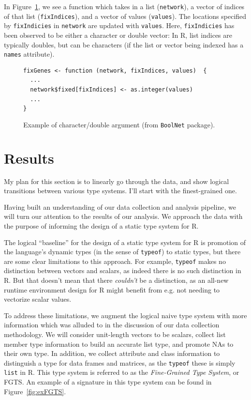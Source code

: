 \documentclass[acmsmall,10pt,review,anonymous]{acmart}\settopmatter{printfolios=true,printccs=false,printacmref=false}
\newcommand{\code}[1]{\lstinline|#1|\xspace}
\begin{document}
In Figure~\ref{fig:chardbl}, we see a function which takes in a list ({\tt network}), a vector of indices of that list ({\tt fixIndices}), and a vector of values ({\tt values}).
The locations specified by {\tt fixIndicies} in {\tt network} are updated with {\tt values}.
Here, {\tt fixIndicies} has been observed to be either a character or double vector:
In R, list indices are typically doubles, but can be characters (if the list or vector being indexed has a {\tt names} attribute).

\begin{figure}[!hb]{\small\begin{lstlisting}[style=R]
fixGenes <- function (network, fixIndices, values)  {
  ...
  network$fixed[fixIndices] <- as.integer(values)
  ...
}
\end{lstlisting}}\caption{Example of character/double argument (from {\tt BoolNet} package).}\label{fig:chardbl}\end{figure}


%
%
%
%
%
%
\section{Results}\label{sec:results}

 My plan for this section is to linearly go through the
data, and show logical transitions between various type systems.  I'll start
with the finest-grained one.

Having built an understanding of our data collection and analysis
pipeline, we will turn our attention to the results of our analysis.  We
approach the data with the purpose of informing the design of a static type
system for R. 

The logical ``baseline'' for the design of a static type system for R is
promotion of the language's dynamic types (in the sense of \code{typeof}) to
static types, but there are some clear limitations to this approach.  For
example, \code{typeof} makes no distinction between vectors and scalars, as
indeed there is no such distinction in R.  But that doesn't mean that there
{\it couldn't} be a distinction, as an all-new runtime environment design
for R might benefit from e.g. not needing to vectorize scalar values.

To address these limitations, we augment the logical naive type system with
more information which was alluded to in the discussion of our data
collection methodology.  We will consider unit-length vectors to be scalars,
collect list member type information to build an accurate list type, and
promote NAs to their own type.  In addition, we collect attribute and class
information to distinguish a type for data frames and matrices, as the
\code{typeof} these is simply {\tt list} in R.  This type system is referred
to as the {\it Fine-Grained Type System}, or FGTS.  An example of a signature in
this type system can be found in Figure~\ref{fig:exFGTS}.
\end{document}
